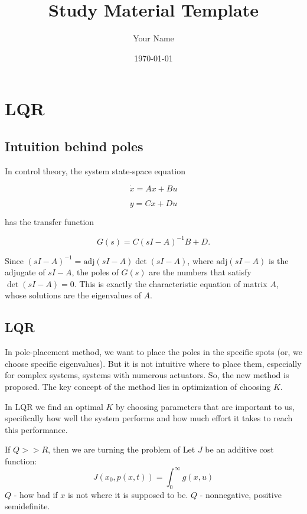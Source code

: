\documentclass{article}
\title{Study Material Template}
\author{Your Name}
\date{\today}
\begin{document}
\maketitle

\tableofcontents
\newpage















\section{LQR}

\subsection{Intuition behind poles}
In control theory, the system state-space equation

\[\dot{x} = Ax+Bu\]

\[y=Cx+Du\]

has the transfer function

\[G(s)=C(sI-A)^{-1}B+D.\]

Since \((sI-A)^{-1}=\text{adj}(sI-A)\det(sI-A)\), where \(\text{adj}(sI-A)\) is the adjugate of \(sI-A\), the poles of \(G(s)\) are the numbers that satisfy \(\det(sI-A)=0\). This is exactly the characteristic equation of matrix \(A\), whose solutions are the eigenvalues of \(A\).

\subsection{LQR}
In pole-placement method, we want to place the poles in the specific spots (or, we choose specific eigenvalues). But it is not intuitive where to place them, especially for complex systems, systems with numerous actuators.
So, the new method is proposed. The key concept of the method lies in optimization of choosing \(K\). 

In LQR we find an optimal \(K\) by choosing parameters that are important to us, specifically how well the system performs and how much effort it takes to reach this performance.

If \(Q>>R\), then we are turning the problem of 
Let \(J\) be an additive cost function:
\[J(x_0, p(x, t)) = \int_{0}^{\infty} g(x, u)\]
\(Q\) - how bad if \(x\) is not where it is supposed to be.
\(Q\) - nonnegative, positive semidefinite.
\end{document}
